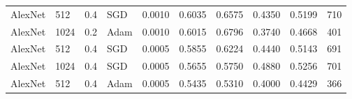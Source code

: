 \begin{landscape}
\begin{table}
\begin{tabular}{l|l|l|l|l|l|l|l|l|l}
    AlexNet & 512 & 0.4 & SGD & 0.0010 & 0.6035 & 0.6575 & 0.4350 & 0.5199 & 710 \\
    AlexNet & 1024 & 0.2 & Adam & 0.0010 & 0.6015 & 0.6796 & 0.3740 & 0.4668 & 401 \\
    AlexNet & 512 & 0.4 & SGD & 0.0005 & 0.5855 & 0.6224 & 0.4440 & 0.5143 & 691 \\
    AlexNet & 1024 & 0.4 & SGD & 0.0005 & 0.5655 & 0.5750 & 0.4880 & 0.5256 & 701 \\
    AlexNet & 512 & 0.4 & Adam & 0.0005 & 0.5435 & 0.5310 & 0.4000 & 0.4429 & 366
    \end{tabular}
    \label{fig:alexnet-results}
\end{table}
\end{landscape}